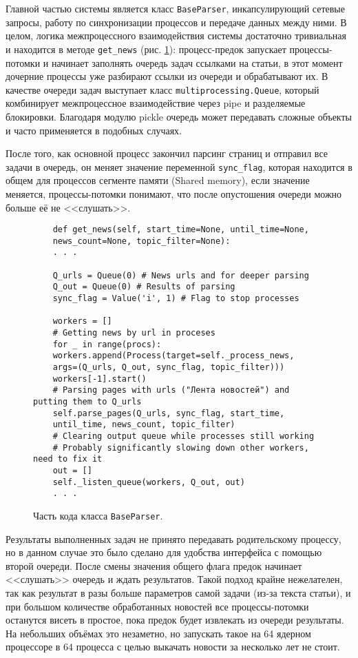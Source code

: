 \documentclass[a4paper, 14pt]{extarticle}
\begin{document}
Главной частью системы является класс \texttt{BaseParser}, инкапсулирующий сетевые запросы, работу по синхронизации процессов и передаче данных между ними. В целом, логика межпроцессного взаимодействия системы достаточно тривиальная и находится в методе \texttt{get\_news} (рис. \ref{getnews}): процесс-предок запускает процессы-потомки и начинает заполнять очередь задач ссылками на статьи, в этот момент дочерние процессы уже разбирают ссылки из очереди и обрабатывают их. В качестве очереди задач выступает класс \texttt{multiprocessing.Queue}, который комбинирует межпроцессное взаимодействие через pipe и разделяемые блокировки. Благодаря модулю pickle очередь может передавать сложные объекты и часто применяется в подобных случаях. 

После того, как основной процесс закончил парсинг страниц и отправил все задачи в очередь, он меняет значение переменной \texttt{sync\_flag}, которая находится в общем для процессов сегменте памяти (Shared memory), если значение меняется, процессы-потомки понимают, что после опустошения очереди можно больше её не <<слушать>>.

\begin{figure}
	\centering
	\begin{verbatim}
	def get_news(self, start_time=None, until_time=None,
	news_count=None, topic_filter=None):
	. . .
	
	Q_urls = Queue(0) # News urls and for deeper parsing 
	Q_out = Queue(0) # Results of parsing
	sync_flag = Value('i', 1) # Flag to stop processes
	
	workers = []
	# Getting news by url in proceses
	for _ in range(procs):
	workers.append(Process(target=self._process_news,
	args=(Q_urls, Q_out, sync_flag, topic_filter)))
	workers[-1].start()
	# Parsing pages with urls ("Лента новостей") and putting them to Q_urls
	self.parse_pages(Q_urls, sync_flag, start_time, 
	until_time, news_count, topic_filter)
	# Clearing output queue while processes still working
	# Probably significantly slowing down other workers, need to fix it
	out = []
	self._listen_queue(workers, Q_out, out)
	. . .
	\end{verbatim}
	\caption{Часть кода класса \texttt{BaseParser}.}
	\label{getnews}
\end{figure}

Результаты выполненных задач не принято передавать родительскому процессу, но в данном случае это было сделано для удобства интерфейса с помощью второй очереди. После смены значения общего флага предок начинает <<слушать>> очередь и ждать результатов. Такой подход крайне нежелателен, так как результат в разы больше параметров самой задачи (из-за текста статьи), и при большом количестве обработанных новостей все процессы-потомки останутся висеть в простое, пока предок будет извлекать из очереди результаты. На небольших объёмах это незаметно, но запускать такое на 64 ядерном процессоре в 64 процесса с целью выкачать новости за несколько лет не стоит.
\end{document}
